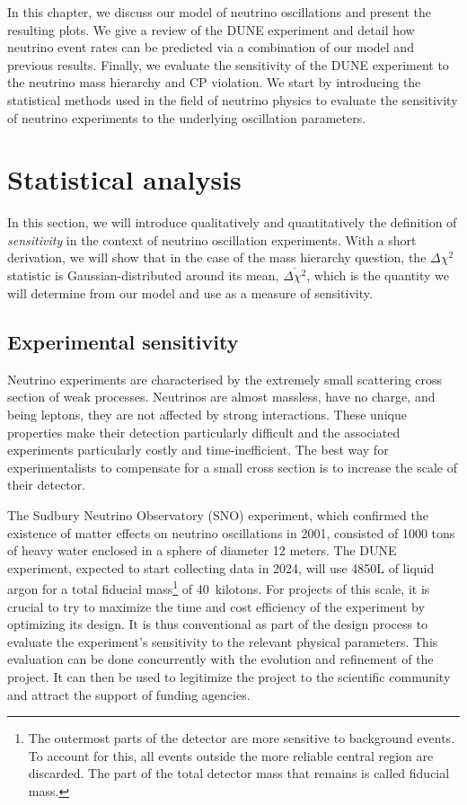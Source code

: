 \label{ch:methods}
In this chapter, we discuss our model of neutrino
oscillations and present the resulting plots. We give a review of the DUNE experiment
and detail how neutrino event rates can be predicted via a combination of our
model and previous results. Finally, we evaluate the sensitivity of the DUNE
experiment to the neutrino mass hierarchy and CP violation.
We start by introducing the statistical methods used in the field of
neutrino physics to evaluate the sensitivity of neutrino experiments to the
underlying oscillation parameters. 

\section{Statistical analysis}\label{sec:statistics}
In this section, we will introduce qualitatively and quantitatively the definition of
\emph{sensitivity} in the context of neutrino oscillation experiments. With a
short derivation, we will show that in the case of the mass hierarchy question,
the $\Delta \chi^2$ statistic is Gaussian-distributed around its mean,
$\overline{\Delta \chi^2}$, which is the quantity we will determine from our
model and use as a measure of sensitivity.

\subsection{Experimental sensitivity}
Neutrino experiments are characterised by the extremely small scattering cross
section of weak processes. Neutrinos are almost massless, have no charge, and
being leptons, they are not affected by strong interactions. These unique
properties make their detection particularly difficult and the associated
experiments particularly costly and time-inefficient. The best way for
experimentalists to compensate for a small cross section is to increase the scale
of their detector. 

The Sudbury Neutrino Observatory (SNO) experiment, which confirmed
the existence of matter effects on neutrino oscillations in 2001, consisted of 1000
tons of heavy water enclosed in a sphere of diameter 12 meters\cite{thomson}.
The DUNE experiment, expected to start collecting data in 2024, will use 4850L
of liquid argon for a total fiducial mass\footnote{The outermost parts of the
detector are more sensitive to background events. To account for this, all
events outside the more reliable central region are discarded. The part of the
total detector mass that remains is called fiducial mass.} of 40~kilotons\cite{cdr}.
For projects of this scale, it is crucial to try to maximize the time and cost
efficiency of the experiment by optimizing its design. It is thus conventional as part of
the design process to evaluate the experiment's sensitivity to the relevant
physical parameters. This evaluation can be done concurrently with the
evolution and refinement of the project. It can then be used to legitimize
the project to the scientific community and attract the support of funding
agencies.

